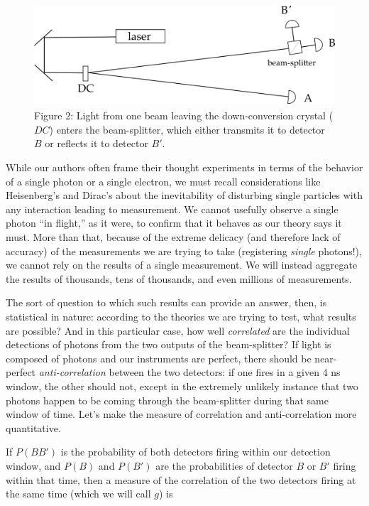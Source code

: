 \begin{figure}[h] 
  \centering
      \captionsetup{width=.75\textwidth}
    \includegraphics[width=4.58333in,height=1.49667in]{images/13_optics-lab/apparatus.png}
    \caption*{Figure 2: Light from one beam leaving the down-conversion crystal ($DC$) enters the beam-splitter, which either transmits it to detector $B$ or reflects it to detector $B'$.}
\end{figure}

While our authors often frame their thought experiments in terms of the behavior of a single photon or a single electron, we must recall considerations like Heisenberg's and Dirac's about the inevitability of disturbing single particles with any interaction leading to measurement. We cannot usefully observe a single photon ``in flight,'' as it were, to confirm that it behaves as our theory says it must. More than that, because of the extreme delicacy (and therefore lack of accuracy) of the measurements we are trying to take (registering \emph{single} photons!), we cannot rely on the results of a single measurement. We will instead aggregate the results of thousands, tens of thousands, and even millions of measurements.

The sort of question to which such results can provide an answer, then, is statistical in nature: according to the theories we are trying to test, what results are possible? And in this particular case, how well \emph{correlated} are the individual detections of photons from the two outputs of the beam-splitter? If light is composed of photons and our instruments are perfect, there should be near-perfect \emph{anti-correlation} between the two detectors: if one fires in a given 4 ns window, the other should not, except in the extremely unlikely instance that two photons happen to be coming through the beam-splitter during that same window of time. Let's make the measure of correlation and anti-correlation more quantitative.

If $P(BB')$ is the probability of both detectors firing within our detection window, and $P(B)$ and $P(B')$ are the probabilities of detector $B$ or $B'$ firing within that time, then a measure of the correlation of the two detectors firing at the same time (which we will call $g$) is

